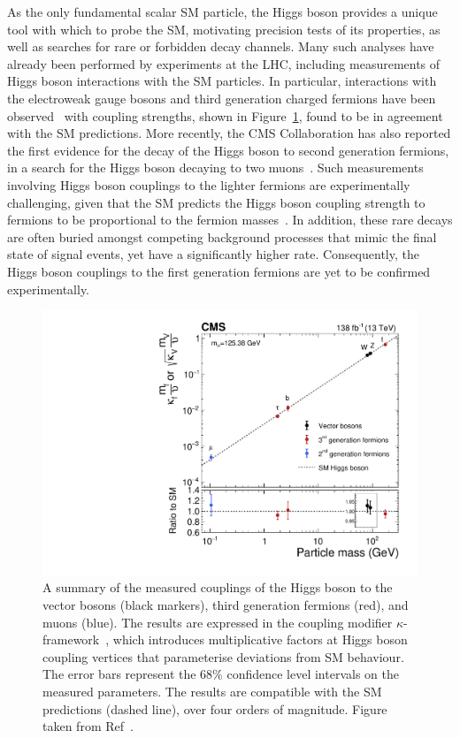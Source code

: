 As the only fundamental scalar SM particle, the Higgs boson provides a unique tool with which to probe the SM, motivating precision tests of its properties, as well as searches for rare or forbidden decay channels. Many such analyses have already been performed by experiments at the LHC, including measurements of Higgs boson interactions with the SM particles. In particular, interactions with the electroweak gauge bosons and third generation charged fermions have been observed~\cite{CMSttH,ATLASttH,CMSHbb,ATLASHbb,CMSHtautau,ATLASHtautau,HIG-19-015,CMS_HWW,CMS_HZZ,CMSHiggsNature,ATLAS_Hgg,ATLAS_HWW,ATLAS_HZZ,ATLAS_HComb} with coupling strengths, shown in Figure~\ref{fig:run_2_couplings}, found to be in agreement with the SM predictions.
More recently, the CMS Collaboration has also reported the first evidence for the decay of the Higgs boson to second generation fermions, in a search for the Higgs boson decaying to two muons~\cite{CMSHMuMu}. 
Such measurements involving Higgs boson couplings to the lighter fermions are experimentally challenging, given that the SM predicts the Higgs boson coupling strength to fermions to be proportional to the fermion masses~\cite{Glashow,Weinberg,Salam}. In addition, these rare decays are often buried amongst competing background processes that mimic the final state of signal events, yet have a significantly higher rate. Consequently, the Higgs boson couplings to the first generation fermions are yet to be confirmed experimentally.

\begin{figure}[htbp!]
\centering
\includegraphics[width =0.65\linewidth]{Figures/Introduction/CMS_couplings_Run2.pdf}\hfill
\caption[Measured couplings of the Higgs boson to vector bosons and fermions.]{A summary of the measured couplings of the Higgs boson to the vector bosons (black markers), third generation fermions (red), and muons (blue). The results are expressed in the coupling modifier $\kappa$-framework~\cite{YR3}, which introduces multiplicative factors at Higgs boson coupling vertices that parameterise deviations from SM behaviour. The error bars represent the 68\% confidence level intervals on the measured parameters. The results are compatible with the SM predictions (dashed line), over four orders of magnitude. Figure taken from Ref~\cite{CMSHiggsNature}. }%
\label{fig:run_2_couplings}
\end{figure}

